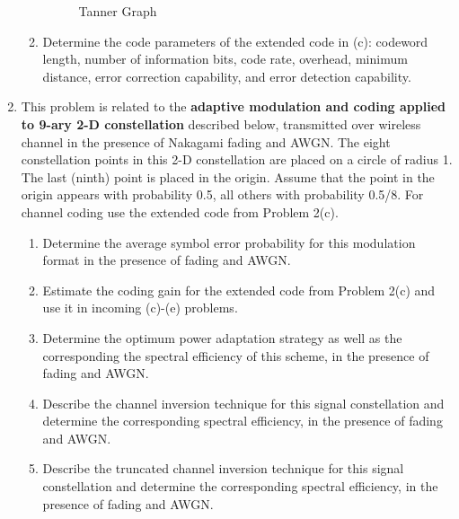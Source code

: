 \documentclass[fleqn]{article}
\begin{document}
\begin{enumerate}
\begin{enumerate}
			\begin{figure}[H]
				\centerline{}
				\caption{Tanner Graph}
				\label{fig::tanner_graph}
			\end{figure}

			\item Determine the code parameters of the extended code in (c): codeword length, number of information bits, code rate, overhead, minimum distance, error correction capability, and error detection capability.
		\end{enumerate}
		
		\item This problem is related to the \textbf{adaptive modulation and coding applied to 9-ary 2-D constellation} described below, transmitted over wireless channel in the presence of Nakagami fading and AWGN. The eight constellation points in this 2-D constellation are placed on a circle of radius 1. The last (ninth) point is placed in the origin. Assume that the point in the origin appears with probability 0.5, all others with probability 0.5/8. For channel coding use the extended code from Problem 2(c).
		
		\begin{enumerate}
			\item Determine the average symbol error probability for this modulation format in the presence of fading and AWGN.
			
			\item Estimate the coding gain for the extended code from Problem 2(c) and use it in incoming (c)-(e) problems.
			
			\item Determine the optimum power adaptation strategy as well as the corresponding the spectral efficiency of this scheme, in the presence of fading and AWGN.
			
			\item Describe the channel inversion technique for this signal constellation and determine the corresponding spectral efficiency, in the presence of fading and AWGN.
			
			\item Describe the truncated channel inversion technique for this signal constellation and determine the corresponding spectral efficiency, in the presence of fading and AWGN.
		\end{enumerate}
		

\end{enumerate}
\end{document}
